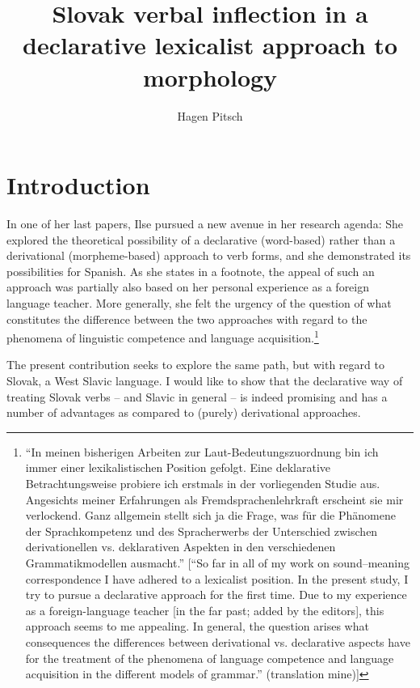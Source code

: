 \documentclass[output=paper,colorlinks,citecolor=brown,
]{langscibook}
\author{Hagen Pitsch\affiliation{University of Göttingen}\orcid{0000-0002-7575-8903}}
\title{Slovak verbal inflection in a declarative lexicalist approach to morphology}
\begin{document}
\maketitle


\section{Introduction}\label{sec:Intro}

In one of her last papers, Ilse \citet{Zimmermann2019} pursued a new avenue in her research agenda: She explored the theoretical possibility of a declarative (word-based) rather than a derivational (morpheme-based) approach to verb forms, and she demonstrated its possibilities for Spanish. As she states in a footnote, the appeal of such an approach was partially also based on her personal experience as a foreign language teacher. More generally, she felt the urgency of the question of what constitutes the difference between the two approaches with regard to the phenomena of linguistic competence and language acquisition.\footnote{``In meinen bisherigen Arbeiten zur Laut-Bedeutungszuordnung bin ich immer einer lexikali\-stischen Position gefolgt. Eine deklarative Betrachtungsweise probiere ich erstmals in der vorliegenden Studie aus. Angesichts meiner Erfahrungen als Fremdsprachenlehrkraft erscheint sie mir verlockend. Ganz allgemein stellt sich ja die Frage, was für die Phänomene der Sprachkompetenz und des Spracherwerbs der Unterschied zwischen derivationellen vs. deklarativen Aspekten in den verschiedenen Grammatikmodellen ausmacht.'' \citep[1]{Zimmermann2019} [``So far in all of my work on sound–meaning correspondence I have adhered to a lexicalist position. In the present study, I try to pursue a declarative approach for the first time. Due to my experience as a foreign-language teacher [in the far past; added by the editors], this approach seems to me appealing. In general, the question arises what consequences the differences between derivational vs. declarative aspects have for the treatment of the phenomena of language competence and language acquisition in the different models of grammar.'' (translation mine)]}

The present contribution seeks to explore the same path, but with regard to Slovak, a West Slavic language. I would like to show that the declarative way of treating Slovak verbs -- and Slavic in general -- is indeed promising and has a number of advantages as compared to (purely) derivational approaches. 
\end{document}

